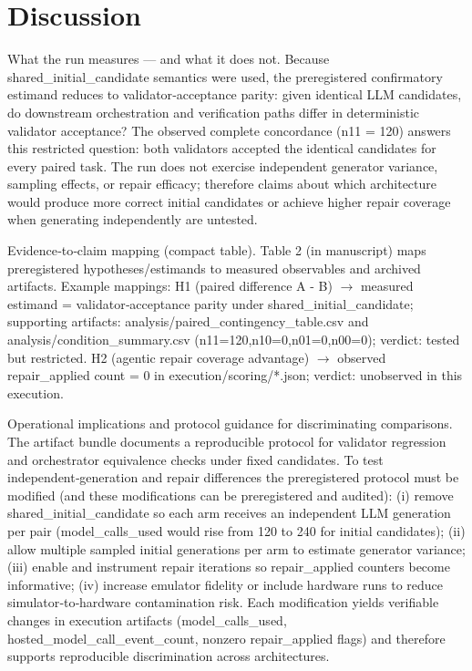 \documentclass[conference]{IEEEtran}
\begin{document}
\section{Discussion}
What the run measures --- and what it does not. Because shared\_initial\_candidate semantics were used, the preregistered confirmatory estimand reduces to validator‑acceptance parity: given identical LLM candidates, do downstream orchestration and verification paths differ in deterministic validator acceptance? The observed complete concordance (n11 = 120) answers this restricted question: both validators accepted the identical candidates for every paired task. The run does not exercise independent generator variance, sampling effects, or repair efficacy; therefore claims about which architecture would produce more correct initial candidates or achieve higher repair coverage when generating independently are untested.

Evidence‑to‑claim mapping (compact table). Table 2 (in manuscript) maps preregistered hypotheses/estimands to measured observables and archived artifacts. Example mappings: H1 (paired difference A - B) \ensuremath{\rightarrow} measured estimand = validator‑acceptance parity under shared\_initial\_candidate; supporting artifacts: analysis/paired\_contingency\_table.csv and analysis/condition\_summary.csv (n11=120,n10=0,n01=0,n00=0); verdict: tested but restricted. H2 (agentic repair coverage advantage) \ensuremath{\rightarrow} observed repair\_applied count = 0 in execution/scoring/*.json; verdict: unobserved in this execution.

Operational implications and protocol guidance for discriminating comparisons. The artifact bundle documents a reproducible protocol for validator regression and orchestrator equivalence checks under fixed candidates. To test independent‑generation and repair differences the preregistered protocol must be modified (and these modifications can be preregistered and audited): (i) remove shared\_initial\_candidate so each arm receives an independent LLM generation per pair (model\_calls\_used would rise from 120 to 240 for initial candidates); (ii) allow multiple sampled initial generations per arm to estimate generator variance; (iii) enable and instrument repair iterations so repair\_applied counters become informative; (iv) increase emulator fidelity or include hardware runs to reduce simulator‑to‑hardware contamination risk. Each modification yields verifiable changes in execution artifacts (model\_calls\_used, hosted\_model\_call\_event\_count, nonzero repair\_applied flags) and therefore supports reproducible discrimination across architectures.
\end{document}
